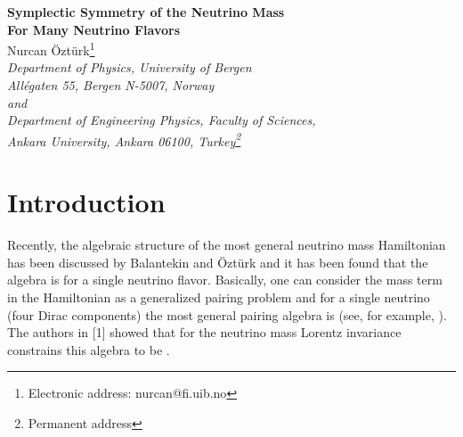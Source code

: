 \documentclass[a4paper,12pt]{article}
\begin{document}
\begin{center}
{\bf \Large Symplectic Symmetry of the Neutrino Mass\\[0.2cm]
For Many Neutrino Flavors}\\[0pt]
\vspace{0.5cm}
{\large Nurcan \"Ozt\"urk\footnote{Electronic address:
nurcan@fi.uib.no}}\\[0pt]\vspace{0.5cm}
{\it Department of Physics, University of Bergen\\ All\'{e}gaten 55, Bergen 
N-5007, Norway\\ and\\ 
Department of Engineering Physics, Faculty of Sciences,\\ Ankara University, 
Ankara 06100, Turkey\footnote{Permanent address}}
\end{center}
\vspace{0.3cm}
\begin{abstract}
\par\noindent
The algebraic structure of the neutrino
mass Hamiltonian is presented for two neutrino flavors  considering
both Dirac and Majorana mass terms. It is shown that the algebra is \coordHE{} 
and also discussed how the algebraic structure generalizes for the case 
of more than two neutrino flavors.
\vspace{0.2cm}
\par\noindent
PACS: 14.60.Pq, 11.30.Na
\end{abstract}
\vspace{0.2cm}                                    

\section{Introduction}

Recently, the algebraic structure of the most general neutrino mass 
Hamiltonian has been 
discussed by Balantekin and \"Ozt\"urk  \cite{baha}
and it has been found that the algebra is \coordHE{} for a single neutrino 
flavor. 
Basically, one can consider the mass term in the Hamiltonian as a 
generalized pairing
problem and for a single neutrino (four Dirac components) the most
general pairing algebra is \coordHE{} (see, for example, \cite{pere}). 
The authors in [1]
showed that for the neutrino mass Lorentz invariance constrains this
algebra to be \coordHE{}. 
\end{document}
